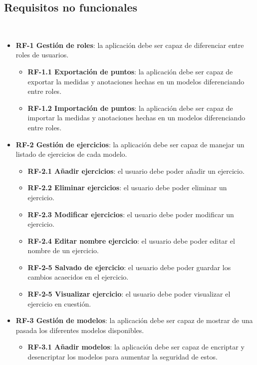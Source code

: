 \subsection{Requisitos no funcionales}\\
\begin{itemize}
	\item \textbf{RF-1 Gestión de roles}: la aplicación debe ser capaz de diferenciar entre roles de usuarios.
	\begin{itemize}
		\item \textbf{RF-1.1 Exportación de puntos}: la aplicación debe ser capaz de exportar la medidas y anotaciones hechas en un modelos diferenciando entre roles.
		\item \textbf{RF-1.2 Importación de puntos}: la aplicación debe ser capaz de importar la medidas y anotaciones hechas en un modelos diferenciando entre roles.
	\end{itemize}
	\item \textbf{RF-2 Gestión de ejercicios}: la aplicación debe ser capaz de manejar un listado de ejercicios de cada modelo.
	\begin{itemize}
		\item \textbf{RF-2.1 Añadir ejercicios}: el usuario debe poder añadir un ejercicio.
		\item \textbf{RF-2.2 Eliminar ejercicios}: el usuario debe poder eliminar un ejercicio.
		\item \textbf{RF-2.3 Modificar ejercicios}: el usuario debe poder modificar un ejercicio.
		\item \textbf{RF-2.4 Editar nombre ejercicio}: el usuario debe poder editar el nombre de un ejercicio.
		\item \textbf{RF-2-5 Salvado de ejercicio}: el usuario debe poder guardar los cambios acaecidos en el ejercicio.
		\item \textbf{RF-2-5 Visualizar ejercicio}: el usuario debe poder visualizar el ejercicio en cuestión.
	\end{itemize}
	\item \textbf{RF-3 Gestión de modelos}: la aplicación debe ser capaz de mostrar de una pasada los diferentes modelos disponibles.
	\begin{itemize}
		\item \textbf{RF-3.1 Añadir modelos}: la aplicación debe ser capaz de encriptar y desencriptar los modelos para aumentar la seguridad de estos.
	\end{itemize}
\end{itemize}

